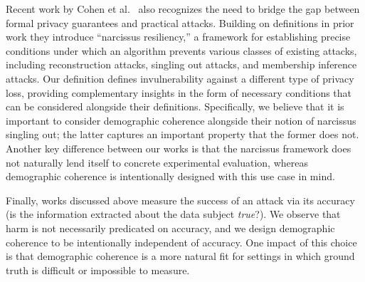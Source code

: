 Recent work by Cohen et al.~\cite{CohenKMMNST24} also recognizes the need to bridge the gap between formal privacy guarantees and practical attacks. Building on definitions in prior work \cite{BalleCH22, CohenN20b, CummingsHSS24} they introduce ``narcissus resiliency,'' a framework for establishing precise conditions under which an algorithm prevents various classes of existing attacks, including reconstruction attacks, singling out attacks, and membership inference attacks.
Our definition defines invulnerability against a different type of privacy loss, providing complementary insights in the form of necessary conditions that can be considered alongside their definitions.  Specifically, we believe that it is important to consider demographic coherence alongside their notion of narcissus singling out; the latter captures an important property that the former does not.  
Another key difference between our works is that the narcissus framework does not naturally lend itself to concrete experimental evaluation, whereas demographic coherence is intentionally designed with this use case in mind.
    
\medskip\noindent
Finally,  works discussed above measure the success of an attack via its accuracy (\ie is the information extracted about the data subject \emph{true}?).  We observe that harm is not necessarily predicated on accuracy, and we design demographic coherence to be intentionally independent of accuracy.  One impact of this choice is that demographic coherence is a more natural fit for settings in which ground truth is difficult or impossible to measure.



